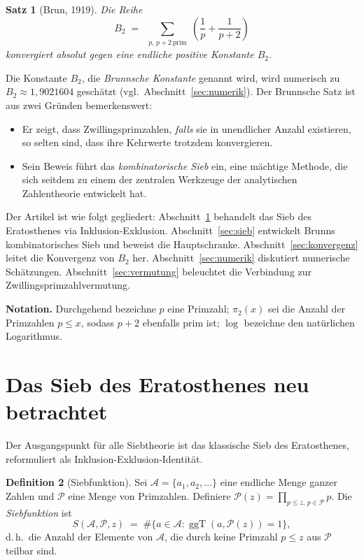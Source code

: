 \documentclass[12pt,a4paper]{amsart}
\newtheorem{theorem}{Satz}[section]
\theoremstyle{definition}
\newtheorem{definition}[theorem]{Definition}
\DeclareMathOperator{\ggT}{ggT}
\begin{document}
\begin{theorem}[Brun, 1919]\label{thm:brun_haupt}
Die Reihe
\[
  B_2 \;=\; \sum_{\substack{p,\,p+2\,\text{prim}}} \left(\frac{1}{p}+\frac{1}{p+2}\right)
\]
konvergiert absolut gegen eine endliche positive Konstante $B_2$.
\end{theorem}

Die Konstante $B_2$, die \emph{Brunnsche Konstante} genannt wird, wird
numerisch zu $B_2 \approx 1{,}9021604$ geschätzt (vgl.\ Abschnitt~\ref{sec:numerik}).
Der Brunnsche Satz ist aus zwei Gründen bemerkenswert:
\begin{itemize}
  \item Er zeigt, dass Zwillingsprimzahlen, \emph{falls} sie in unendlicher
    Anzahl existieren, so selten sind, dass ihre Kehrwerte trotzdem konvergieren.
  \item Sein Beweis führt das \emph{kombinatorische Sieb} ein, eine mächtige
    Methode, die sich seitdem zu einem der zentralen Werkzeuge der analytischen
    Zahlentheorie entwickelt hat.
\end{itemize}

Der Artikel ist wie folgt gegliedert: Abschnitt~\ref{sec:eratosthenes}
behandelt das Sieb des Eratosthenes via Inklusion-Exklusion.
Abschnitt~\ref{sec:sieb} entwickelt Brunns kombinatorisches Sieb und beweist
die Hauptschranke.  Abschnitt~\ref{sec:konvergenz} leitet die Konvergenz von
$B_2$ her.  Abschnitt~\ref{sec:numerik} diskutiert numerische Schätzungen.
Abschnitt~\ref{sec:vermutung} beleuchtet die Verbindung zur
Zwillingsprimzahlvermutung.

\textbf{Notation.}
Durchgehend bezeichne $p$ eine Primzahl; $\pi_2(x)$ sei die Anzahl der
Primzahlen $p \leq x$, sodass $p+2$ ebenfalls prim ist; $\log$ bezeichne
den natürlichen Logarithmus.

\section{Das Sieb des Eratosthenes neu betrachtet}
\label{sec:eratosthenes}

Der Ausgangspunkt für alle Siebtheorie ist das klassische Sieb des Eratosthenes,
reformuliert als Inklusion-Exklusion-Identität.

\begin{definition}[Siebfunktion]
  Sei $\mathcal{A} = \{a_1, a_2, \ldots\}$ eine endliche Menge ganzer Zahlen und
  $\mathcal{P}$ eine Menge von Primzahlen.  Definiere
  $\mathcal{P}(z) = \prod_{p \leq z,\, p \in \mathcal{P}} p$.
  Die \emph{Siebfunktion} ist
  \[
    S(\mathcal{A}, \mathcal{P}, z)
    \;=\; \#\{a \in \mathcal{A} : \ggT(a, \mathcal{P}(z)) = 1\},
  \]
  d.\,h.\ die Anzahl der Elemente von $\mathcal{A}$, die durch keine Primzahl
  $p \leq z$ aus $\mathcal{P}$ teilbar sind.
\end{definition}
\end{document}
